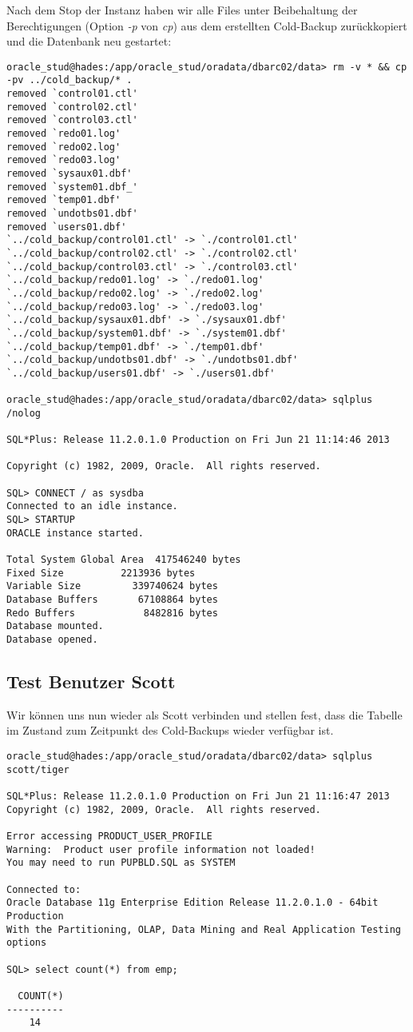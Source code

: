 \documentclass[11pt,a4paper,parskip=half]{scrartcl}
\begin{document}
Nach dem Stop der Instanz haben wir alle Files unter Beibehaltung der Berechtigungen (Option \emph{-p} von \emph{cp}) aus dem erstellten Cold-Backup zurückkopiert und die Datenbank neu gestartet:
\begin{lstlisting}
oracle_stud@hades:/app/oracle_stud/oradata/dbarc02/data> rm -v * && cp -pv ../cold_backup/* .
removed `control01.ctl'
removed `control02.ctl'
removed `control03.ctl'
removed `redo01.log'
removed `redo02.log'
removed `redo03.log'
removed `sysaux01.dbf'
removed `system01.dbf_'
removed `temp01.dbf'
removed `undotbs01.dbf'
removed `users01.dbf'
`../cold_backup/control01.ctl' -> `./control01.ctl'
`../cold_backup/control02.ctl' -> `./control02.ctl'
`../cold_backup/control03.ctl' -> `./control03.ctl'
`../cold_backup/redo01.log' -> `./redo01.log'
`../cold_backup/redo02.log' -> `./redo02.log'
`../cold_backup/redo03.log' -> `./redo03.log'
`../cold_backup/sysaux01.dbf' -> `./sysaux01.dbf'
`../cold_backup/system01.dbf' -> `./system01.dbf'
`../cold_backup/temp01.dbf' -> `./temp01.dbf'
`../cold_backup/undotbs01.dbf' -> `./undotbs01.dbf'
`../cold_backup/users01.dbf' -> `./users01.dbf'

oracle_stud@hades:/app/oracle_stud/oradata/dbarc02/data> sqlplus /nolog

SQL*Plus: Release 11.2.0.1.0 Production on Fri Jun 21 11:14:46 2013

Copyright (c) 1982, 2009, Oracle.  All rights reserved.

SQL> CONNECT / as sysdba
Connected to an idle instance.
SQL> STARTUP
ORACLE instance started.

Total System Global Area  417546240 bytes
Fixed Size		    2213936 bytes
Variable Size		  339740624 bytes
Database Buffers	   67108864 bytes
Redo Buffers		    8482816 bytes
Database mounted.
Database opened.
\end{lstlisting}

\subsection{Test Benutzer Scott}
Wir können uns nun wieder als Scott verbinden und stellen fest, dass die Tabelle im Zustand zum Zeitpunkt des Cold-Backups wieder verfügbar ist.
\begin{lstlisting}
oracle_stud@hades:/app/oracle_stud/oradata/dbarc02/data> sqlplus scott/tiger

SQL*Plus: Release 11.2.0.1.0 Production on Fri Jun 21 11:16:47 2013
Copyright (c) 1982, 2009, Oracle.  All rights reserved.

Error accessing PRODUCT_USER_PROFILE
Warning:  Product user profile information not loaded!
You may need to run PUPBLD.SQL as SYSTEM

Connected to:
Oracle Database 11g Enterprise Edition Release 11.2.0.1.0 - 64bit Production
With the Partitioning, OLAP, Data Mining and Real Application Testing options

SQL> select count(*) from emp;

  COUNT(*)
----------
	14
\end{lstlisting}
\end{document}
